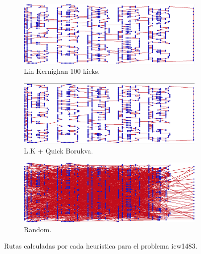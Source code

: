 \documentclass[13pt,a4paper]{article}
\begin{document}
\begin{figure}[t]
    \begin{subfigure}[t]{0.3\textwidth}
        \centering
        \includegraphics[width=\textwidth]{img/2/L100.png}
        \caption{Lin Kernighan 100 kicks.}
    \end{subfigure}
    \begin{subfigure}[t]{0.3\textwidth}
        \centering
        \includegraphics[width=\textwidth]{img/2/L+Q.png}
        \caption{L.K + Quick Borukva.}
    \end{subfigure}
    \begin{subfigure}[t]{0.3\textwidth}
        \centering
        \includegraphics[width=\textwidth]{img/2/R.png}
        \caption{Random.}
    \end{subfigure}
    \caption{Rutas calculadas por cada heurística para el problema icw1483.}
\end{figure}
\end{document}
